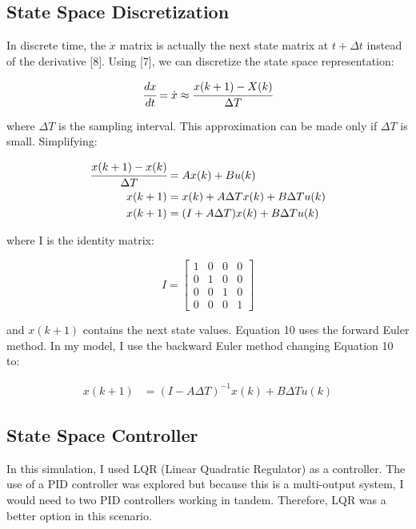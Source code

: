 \documentclass{article}
\begin{document}
\subsection{State Space Discretization}

In discrete time, the $\Dot{x}$ matrix is actually the next state matrix at $t + \Delta{t}$ instead of the derivative [8]. Using [7], we can discretize the state space representation:

\begin{align}
    \cfrac{dx}{dt} = \Dot{x} \approx \cfrac{x(k+1)- X(k)}{\Delta{T}}
\end{align}

\noindent where $\Delta{T}$ is the sampling interval. This approximation can be made only if $\Delta{T}$ is small. Simplifying: 

\begin{align}
    \cfrac{x(k+1)- x(k)}{\Delta{T}} & = Ax(k) + Bu(k) \\ 
    x(k+1) & = x(k) + A\Delta T x(k) + B\Delta T u(k) \\
    x(k+1) & = (I + A\Delta T)x(k) + B\Delta T u(k)
\end{align}

\noindent where I is the identity matrix:

\begin{equation}
    I = 
    \begin{bmatrix}
        1&0&0&0 \\
        0&1&0&0 \\
        0&0&1&0 \\
        0&0&0&1
    \end{bmatrix}
\end{equation}

\noindent and $x(k+1)$ contains the next state values. Equation 10 uses the forward Euler method. In my model, I use the backward Euler method changing Equation 10 to:

\begin{align}
    x(k+1) & = (I - A\Delta T)^{-1}x(k) + B\Delta T u(k)
\end{align}

\subsection{State Space Controller}

In this simulation, I used LQR (Linear Quadratic Regulator) as a controller. The use of a PID controller was explored but because this is a multi-output system, I would need to two PID controllers working in tandem. Therefore, LQR was a better option in this scenario.
\end{document}
